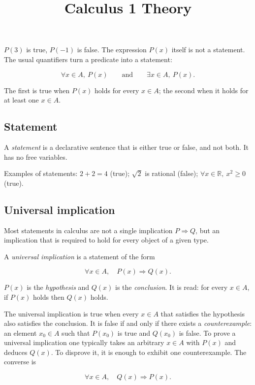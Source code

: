 \documentclass[11pt,a4paper]{article} \usepackage[T1]{fontenc}
\theoremstyle{plain} \newtheorem{theorem}{Theorem} \title{Calculus 1 Theory}
\begin{document}
$P(3)$ is true, $P(-1)$ is false. The expression $P(x)$ itself is not a
statement. The usual quantifiers turn a predicate into a statement:

\[
\forall x\in A,\ P(x) \qquad\text{and}\qquad \exists x\in A,\ P(x).
\]

The first is true when $P(x)$ holds for every $x\in A$; the second when it
holds for at least one $x\in A$.

\subsection{Statement}

\begin{definition}
[Statement] A \emph{statement} is a declarative sentence that is either true or
false, and not both. It has no free variables.
\end{definition}

Examples of statements: $2+2=4$ (true); $\sqrt{2}$ is rational (false);
$\forall x\in\mathbb{R},\ x^2\ge 0$ (true).

\subsection{Universal implication}

Most statements in calculus are not a single implication $P\Rightarrow Q$, but
an implication that is required to hold for every object of a given type.

\begin{definition}
 A \emph{universal implication} is a statement of the
form

\[
\forall x\in A,\quad P(x)\Rightarrow Q(x).
\]

$P(x)$ is the \emph{hypothesis} and $Q(x)$ is the \emph{conclusion}. It is
read: for every $x\in A$, if $P(x)$ holds then $Q(x)$ holds.
\end{definition}

The universal implication is true when every $x\in A$ that satisfies the
hypothesis also satisfies the conclusion. It is false if and only if there
exists a \emph{counterexample}: an element $x_0\in A$ such that $P(x_0)$ is
true and $Q(x_0)$ is false. To prove a universal implication one typically
takes an arbitrary $x\in A$ with $P(x)$ and deduces $Q(x)$. To disprove it, it
is enough to exhibit one counterexample. The converse is

\[
\forall x\in A,\quad Q(x)\Rightarrow P(x).
\]
\end{document}
